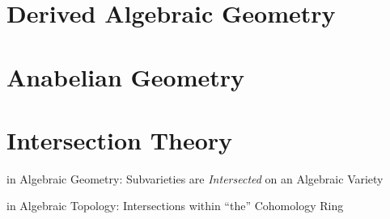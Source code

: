\section{Derived Algebraic Geometry}
\label{sec:derived_algebraic_geometry}

\section{Anabelian Geometry}\label{sec:anabelian_geometry}

\section{Intersection Theory}\label{sec:intersection_theory}

in Algebraic Geometry: Subvarieties are \emph{Intersected} on an
Algebraic Variety

in Algebraic Topology: Intersections within ``the'' Cohomology Ring
